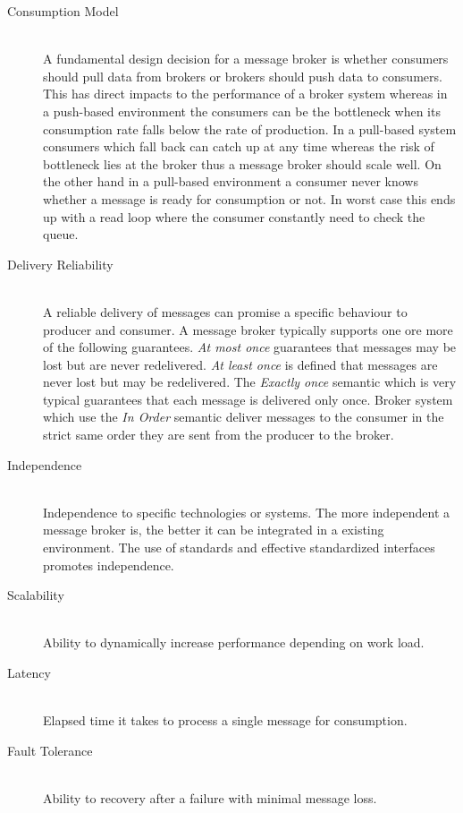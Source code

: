 \begin{description}
    \item [Consumption Model] \hfill \\
    { A fundamental design decision for a message broker is whether consumers
    should pull data from brokers or brokers should push data to consumers. This
has direct impacts to the performance of a broker system whereas in a push-based
environment the consumers can be the bottleneck when its consumption rate falls
below the rate of production. In a pull-based system consumers which fall back
can catch up at any time whereas the risk of bottleneck lies at the broker thus
 a message broker should scale well. On the other hand in a pull-based
 environment a consumer never knows whether a message is ready for consumption
 or not. In worst case this ends up with a read loop where the consumer
 constantly need to check the queue. \cite{apachekafka} }
    \item [Delivery Reliability] \hfill \\
    {
    A reliable delivery of messages can promise a specific behaviour to producer
    and consumer. A message broker typically supports one ore more of the
    following guarantees.
    \textit{At most once} guarantees that messages may be lost but are never
    redelivered. \textit{At least once} is defined that messages are never lost
    but may be redelivered. The \textit{Exactly once} semantic which is very
    typical guarantees that each message is delivered only once. Broker system
    which use the \textit{In Order} semantic deliver messages to the consumer in
    the strict same order they are sent from the producer to the broker. 
    }
    \item [Independence] \hfill \\
    { Independence to specific technologies or systems. The more independent a
        message broker is, the better it can be integrated in a existing
        environment. The use of standards and effective standardized interfaces
        promotes independence.}
    \item [Scalability] \hfill \\
    {Ability to dynamically increase performance depending on work load.  }
    \item [Latency]\hfill \\
    {Elapsed time it takes to process a single message for consumption.  }
\item [Fault Tolerance] \hfill \\
        {Ability to recovery after a failure with minimal message loss.
}
\end{description}
